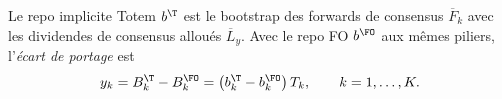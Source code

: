 \begin{definition}\label{def-implied}
Le repo implicite Totem $b^\T$ est le bootstrap des forwards de consensus $\overline{F}_k$ avec les dividendes de
consensus alloués $\overline{L}_y$. Avec le repo FO $b^\FO$ aux mêmes piliers, l'\emph{écart de portage} est
\begin{equation}\label{eq-y}
y_k=B^\T_k-B^\FO_k=\bigl(b^\T_k-b^\FO_k\bigr)\,T_k,\qquad k=1,\dots,K.
\end{equation}
\end{definition}
